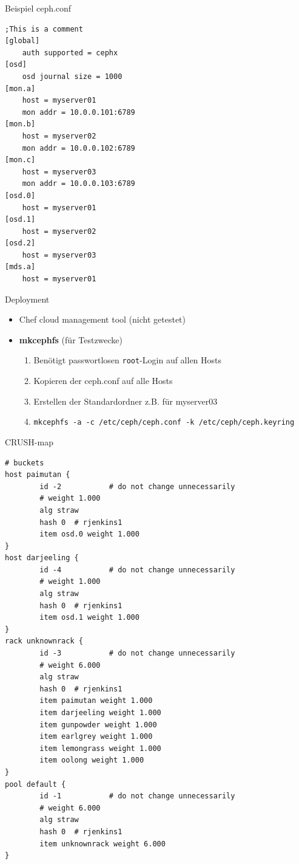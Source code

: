 \documentclass[hyperref={xetex}]{beamer}
\begin{document}
\begin{frame}[fragile]{Beispiel ceph.conf}

\begin{lstlisting}
;This is a comment
[global]
	auth supported = cephx
[osd]
	osd journal size = 1000
[mon.a]
	host = myserver01
	mon addr = 10.0.0.101:6789
[mon.b]
	host = myserver02
	mon addr = 10.0.0.102:6789
[mon.c]
	host = myserver03
	mon addr = 10.0.0.103:6789
[osd.0]
	host = myserver01
[osd.1]
	host = myserver02
[osd.2]
	host = myserver03
[mds.a]
	host = myserver01
\end{lstlisting}
\end{frame}



\begin{frame}{Deployment}
	\begin{itemize}
		\item Chef cloud management tool (nicht getestet)
		\item \textbf{mkcephfs} (f\"ur Testzwecke)
			\begin{enumerate}
				\item Ben\"otigt passwortlosen \texttt{root}-Login auf allen Hosts
				\item Kopieren der ceph.conf auf alle Hosts
				\item Erstellen der Standardordner z.B. f\"ur myserver03
				\item \texttt{mkcephfs -a -c /etc/ceph/ceph.conf -k /etc/ceph/ceph.keyring}
			\end{enumerate}
	\end{itemize}
\end{frame}


\begin{frame}[fragile]{CRUSH-map}
    \begin{lstlisting}
# buckets
host paimutan {
        id -2           # do not change unnecessarily
        # weight 1.000
        alg straw
        hash 0  # rjenkins1
        item osd.0 weight 1.000
}
host darjeeling {
        id -4           # do not change unnecessarily
        # weight 1.000
        alg straw
        hash 0  # rjenkins1
        item osd.1 weight 1.000
}
rack unknownrack {
        id -3           # do not change unnecessarily
        # weight 6.000
        alg straw
        hash 0  # rjenkins1
        item paimutan weight 1.000
        item darjeeling weight 1.000
        item gunpowder weight 1.000
        item earlgrey weight 1.000
        item lemongrass weight 1.000
        item oolong weight 1.000
}
pool default {
        id -1           # do not change unnecessarily
        # weight 6.000
        alg straw
        hash 0  # rjenkins1
        item unknownrack weight 6.000
}
    \end{lstlisting}
\end{frame}
\end{document}

